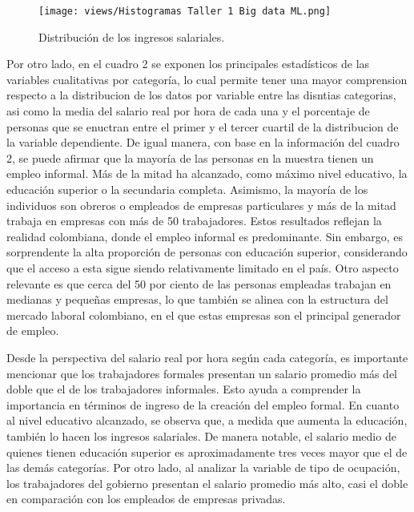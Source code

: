 \documentclass[10pt]{article}
\begin{document}
\begin{figure}[H]  
    \centering
    \texttt{[image: views/Histogramas Taller 1 Big data ML.png]} %
    \caption{Distribución de los ingresos salariales.}
    \label{fig: Gráfico 1}  %
\end{figure}

Por otro lado, en el cuadro 2 se exponen los principales estadísticos de las variables cualitativas por categoría, lo cual permite tener una mayor comprension respecto a la distribucion de los datos por variable entre las disntias categorias, asi como la media del salario real por hora de cada una y el porcentaje de personas que se enuctran entre el primer y el tercer cuartil de la distribucion de la variable dependiente. 
De igual manera, con base en la información del cuadro 2, se puede afirmar que la mayoría de las personas en la muestra tienen un empleo informal. Más de la mitad ha alcanzado, como máximo nivel educativo, la educación superior o la secundaria completa. Asimismo, la mayoría de los individuos son obreros o empleados de empresas particulares y más de la mitad trabaja en empresas con más de 50 trabajadores. Estos resultados reflejan la realidad colombiana, donde el empleo informal es predominante. Sin embargo, es sorprendente la alta proporción de personas con educación superior, considerando que el acceso a esta sigue siendo relativamente limitado en el país. Otro aspecto relevante es que cerca del 50 por ciento de las personas empleadas trabajan en medianas y pequeñas empresas, lo que también se alinea con la estructura del mercado laboral colombiano, en el que estas empresas son el principal generador de empleo.



Desde la perspectiva del salario real por hora según cada categoría, es importante mencionar que los trabajadores formales presentan un salario promedio más del doble que el de los trabajadores informales. Esto ayuda a comprender la importancia en términos de ingreso de la creación del empleo formal. En cuanto al nivel educativo alcanzado, se observa que, a medida que aumenta la educación, también lo hacen los ingresos salariales. De manera notable, el salario medio de quienes tienen educación superior es aproximadamente tres veces mayor que el de las demás categorías. Por otro lado, al analizar la variable de tipo de ocupación, los trabajadores del gobierno presentan el salario promedio más alto, casi el doble en comparación con los empleados de empresas privadas.
\end{document}
